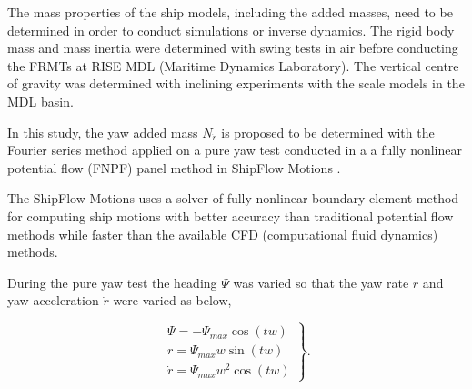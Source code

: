 \noindent The mass properties of the ship models, including the added masses, need to be determined in order to conduct simulations or inverse dynamics. The rigid body mass and mass inertia were determined with swing tests in air before conducting the FRMTs at RISE MDL (Maritime Dynamics Laboratory). The vertical centre of gravity was determined with inclining experiments with the scale models in the MDL basin.

In this study, the yaw added mass $N_{\dot{r}}$ is proposed to be determined with the Fourier series method \citep{sakamotoURANSSimulationsStatic2012} applied on a pure yaw test conducted in a a fully nonlinear potential flow (FNPF) panel method in ShipFlow Motions \citep{kjellbergFullyNonlinearUnsteady2013}.

The ShipFlow Motions uses a solver of fully nonlinear boundary element method for computing ship motions with better accuracy than traditional potential flow methods while faster than the available CFD (computational fluid dynamics) methods.


During the pure yaw test the heading $\Psi$ was varied  so that the yaw rate $r$ and yaw acceleration $\dot{r}$ were varied as below,

\begin{equation}
    \left.\begin{aligned}
    \Psi = - \Psi_{max} \cos{\left(t w \right)} \\
    r = \Psi_{max} w \sin{\left(t w \right)} \\
    \dot{r} = \Psi_{max} w^{2} \cos{\left(t w \right)}
    \end{aligned}\right\}.
    \label{eq:pure_yaw_psi}
\end{equation}

